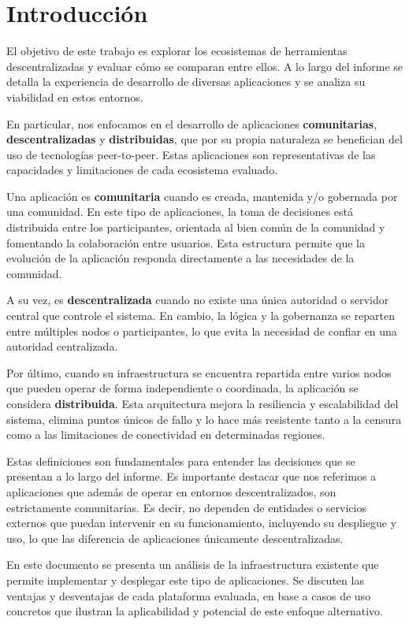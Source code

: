 \section{Introducción}

El objetivo de este trabajo es explorar los ecosistemas de herramientas descentralizadas y evaluar cómo se comparan entre ellos. A lo largo del informe se detalla la experiencia de desarrollo de diversas aplicaciones y se analiza su viabilidad en estos entornos.

En particular, nos enfocamos en el desarrollo de aplicaciones \textbf{comunitarias}, \textbf{descentralizadas} y \textbf{distribuidas}, que por su propia naturaleza se benefician del uso de tecnologías peer-to-peer. Estas aplicaciones son representativas de las capacidades y limitaciones de cada ecosistema evaluado.

Una aplicación es \textbf{comunitaria} cuando es creada, mantenida y/o gobernada por una comunidad. En este tipo de aplicaciones, la toma de decisiones está distribuida entre los participantes, orientada al bien común de la comunidad y fomentando la colaboración entre usuarios. Esta estructura permite que la evolución de la aplicación responda directamente a las necesidades de la comunidad.

A su vez, es \textbf{descentralizada} cuando no existe una única autoridad o servidor central que controle el sistema. En cambio, la lógica y la gobernanza se reparten entre múltiples nodos o participantes, lo que evita la necesidad de confiar en una autoridad centralizada.

Por último, cuando su infraestructura se encuentra repartida entre varios nodos que pueden operar de forma independiente o coordinada, la aplicación se considera \textbf{distribuida}. Esta arquitectura mejora la resiliencia y escalabilidad del sistema, elimina puntos únicos de fallo y lo hace más resistente tanto a la censura como a las limitaciones de conectividad en determinadas regiones.

Estas definiciones son fundamentales para entender las decisiones que se presentan a lo largo del informe. Es importante destacar que nos referimos a aplicaciones que además de operar en entornos descentralizados, son estrictamente comunitarias. Es decir, no dependen de entidades o servicios externos que puedan intervenir en su funcionamiento, incluyendo su despliegue y uso, lo que las diferencia de aplicaciones únicamente descentralizadas.

En este documento se presenta un análisis de la infraestructura existente que permite implementar y desplegar este tipo de aplicaciones. Se discuten las ventajas y desventajas de cada plataforma evaluada, en base a casos de uso concretos que ilustran la aplicabilidad y potencial de este enfoque alternativo.


